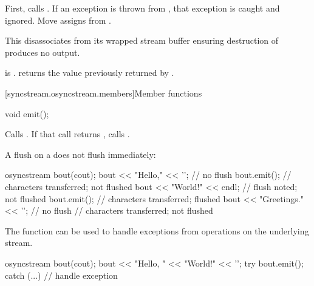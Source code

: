 \begin{itemdescr}
\pnum
\effects
First, calls .
If an exception is thrown from ,
that exception is caught and ignored.
Move assigns  from .
\begin{note}
This disassociates 
from its wrapped stream buffer
ensuring destruction of  produces no output.
\end{note}

\pnum
\ensures
{} is .
 returns the value
previously returned by .
\end{itemdescr}

[syncstream.osyncstream.members]{Member functions}

%
\begin{itemdecl}
void emit();
\end{itemdecl}

\begin{itemdescr}
\pnum
\effects
Calls .
If that call returns ,
calls .

\pnum
\begin{example}
A flush on a  does not flush immediately:
\begin{codeblock}
{
  osyncstream bout(cout);
  bout << "Hello," << '\n';     // no flush
  bout.emit();                  // characters transferred;  not flushed
  bout << "World!" << endl;     // flush noted;  not flushed
  bout.emit();                  // characters transferred;  flushed
  bout << "Greetings." << '\n'; // no flush
}   // characters transferred;  not flushed
\end{codeblock}
\end{example}

\pnum
\begin{example}
The function  can be used to
handle exceptions from operations on the underlying stream.
\begin{codeblock}
{
  osyncstream bout(cout);
  bout << "Hello, " << "World!" << '\n';
  try {
    bout.emit();
  } catch (...) {
    // handle exception
  }
}
\end{codeblock}
\end{example}
\end{itemdescr}

